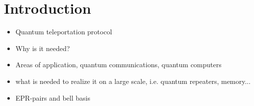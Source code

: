 \section{Introduction}
\begin{itemize}
    \item Quantum teleportation protocol
    \item Why is it needed?
    \item Areas of application, quantum communications, quantum computers
    \item what is needed to realize it on a large scale, i.e. quantum repeaters, memory...
    \item EPR-pairs and bell basis
\end{itemize}